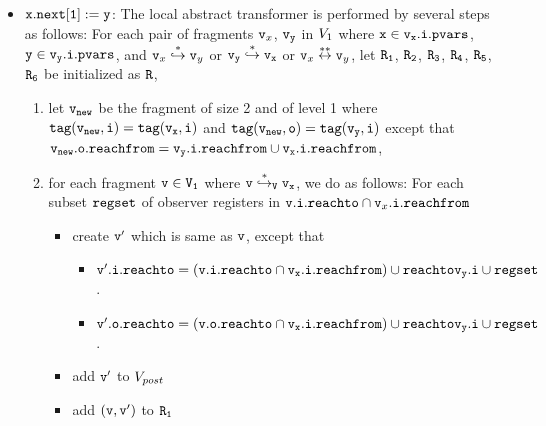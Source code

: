 \begin{itemize}

\item  ${\tt x.next[1]:= y}$: The local abstract transformer is performed by several steps as follows: For each pair of fragments $\mathtt{v}_x$, $\tt \mathtt{v}_y$ in $V_1$ where $\tt x \in \mathtt{v}_x.\mathtt{i}.\mathtt{pvars}$, $\tt y \in\mathtt{v}_y.\mathtt{i}.\mathtt{pvars}$, and $\mathtt{v}_x \overset{*}\hookrightarrow \mathtt{v}_y$ or $\tt \mathtt{v}_y \overset{*}\hookrightarrow \mathtt{v}_x$ or $\mathtt{v}_x \overset{**}\leftrightarrow \mathtt{v}_y$, let $\tt R_1$, $\tt R_2$, $\tt R_3$, $\tt R_4$, $\tt R_5$, $\tt R_6$ be initialized as $\tt R$,  
\begin{enumerate}
\item let $\tt \mathtt{v}_{new}$ be the fragment of size 2 and of level 1 where $\tt tag(\mathtt{v}_{new},i) = tag(\mathtt{v}_x, i)$ and $\tt tag(\mathtt{v}_{new},o) = tag(\mathtt{v}_y,i)$ except that $\tt \mathtt{v}_{new}.\mathtt{o}.\mathtt{reachfrom} = \mathtt{v}_y.\mathtt{i}.\mathtt{reachfrom} \cup \mathtt{v}_x.\mathtt{i}.\mathtt{reachfrom}$,
\item  for each fragment $\tt v \in V_1$ where $\tt v \overset{*}\hookrightarrow_{V} \mathtt{v}_x$, we do as follows: For each subset $\mathtt{regset}$ of observer registers in $\mathtt{v}.\mathtt{i}.\mathtt{reachto} \cap \mathtt{v}_x.\mathtt{i}.\mathtt{reachfrom}$


\begin{itemize}
\item create $\tt v'$ which is same as $\tt v$, except that
\begin{itemize}
\item $\mathtt{v}'.\mathtt{i}.\mathtt{reachto} = (\tt \mathtt{v}.\mathtt{i}.\mathtt{reachto} \cap \mathtt{v}_x.\mathtt{i}.\mathtt{reachfrom}) \cup \mathtt{reachto}{\mathtt{v}_y.\mathtt{i}} \cup \mathtt{regset}$.
\item $\mathtt{v}'.\mathtt{o}.\mathtt{reachto} = (\tt \mathtt{v}.\mathtt{o}.\mathtt{reachto} \cap \mathtt{v}_x.\mathtt{i}.\mathtt{reachfrom}) \cup \mathtt{reachto}{\mathtt{v}_y.\mathtt{i}} \cup \mathtt{regset}$.
\end{itemize}
\item add $\tt v'$ to $V_{post}$ 
\item add $\tt (v,v')$ to $\tt R_1$
\end{itemize}


\end{enumerate}
\end{itemize}
